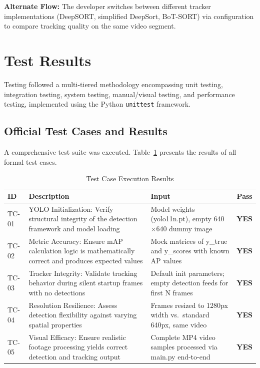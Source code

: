 \documentclass[10pt,twocolumn,a4paper]{article}
\begin{document}
\textbf{Alternate Flow:} The developer switches between different tracker implementations (DeepSORT, simplified DeepSort, BoT-SORT) via configuration to compare tracking quality on the same video segment.

\section{Test Results}

Testing followed a multi-tiered methodology encompassing unit testing, integration testing, system testing, manual/visual testing, and performance testing, implemented using the Python \texttt{unittest} framework.

\subsection{Official Test Cases and Results}

A comprehensive test suite was executed. Table~\ref{tab:testresults} presents the results of all formal test cases.

\begin{table}[H]
\centering
\caption{Test Case Execution Results}
\label{tab:testresults}
\scriptsize
\begin{tabularx}{\columnwidth}{l X X c}
\toprule
\textbf{ID} & \textbf{Description} & \textbf{Input} & \textbf{Pass} \\
\midrule
TC-01 & YOLO Initialization: Verify structural integrity of the detection framework and model loading & Model weights (yolo11n.pt), empty 640$\times$640 dummy image & \textcolor{green!60!black}{\textbf{YES}} \\
\midrule
TC-02 & Metric Accuracy: Ensure mAP calculation logic is mathematically correct and produces expected values & Mock matrices of y\_true and y\_scores with known AP values & \textcolor{green!60!black}{\textbf{YES}} \\
\midrule
TC-03 & Tracker Integrity: Validate tracking behavior during silent startup frames with no detections & Default init parameters; empty detection feeds for first N frames & \textcolor{green!60!black}{\textbf{YES}} \\
\midrule
TC-04 & Resolution Resilience: Assess detection flexibility against varying spatial properties & Frames resized to 1280px width vs.\ standard 640px, same video & \textcolor{green!60!black}{\textbf{YES}} \\
\midrule
TC-05 & Visual Efficacy: Ensure realistic footage processing yields correct detection and tracking output & Complete MP4 video samples processed via main.py end-to-end & \textcolor{green!60!black}{\textbf{YES}} \\
\bottomrule
\end{tabularx}
\end{table}
\end{document}
